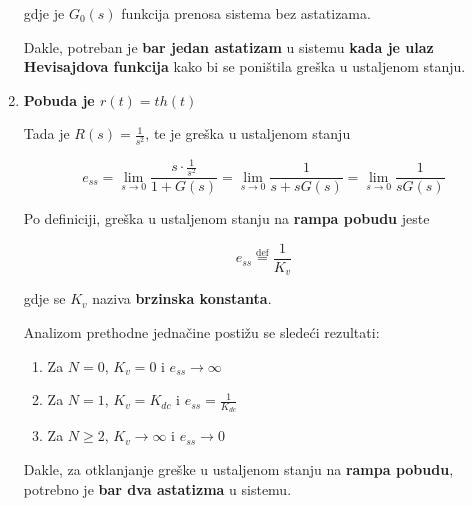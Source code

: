 \documentclass[12pt]{IEEEtran}
\numberwithin{equation}{subsection}
\numberwithin{figure}{section}
\begin{document}
\begin{enumerate}
          gdje je $G_{0}(s)$ funkcija prenosa sistema bez astatizama.

          Dakle, potreban je \textbf{bar jedan astatizam} u sistemu \textbf{kada je ulaz Hevisajdova funkcija} kako bi se poni\v{s}tila
          gre\v{s}ka u ustaljenom stanju.

          \vspace{12pt}

    \item \textbf{Pobuda je $r(t) = th(t)$}

          Tada je $R(s) = \frac{1}{s^{2}}$, te je gre\v{s}ka u ustaljenom stanju

          \begin{equation}
              e_{ss} = \lim_{s \to 0}{\frac{s \cdot \frac{1}{s^{2}}}{1 + G(s)}} = \lim_{s \to 0}{\frac{1}{s + sG(s)}} = \lim_{s \to 0}{\frac{1}{sG(s)}}
          \end{equation}

          Po definiciji, gre\v{s}ka u ustaljenom stanju na \textbf{rampa pobudu} jeste

          \begin{equation}
              e_{ss} \stackrel{\text{def}}{=} \frac{1}{K_{v}}
          \end{equation}

          gdje se $K_{v}$ naziva \textbf{brzinska konstanta}.

          \vspace{12pt}

          Analizom prethodne jedna\v{c}ine posti\v{z}u se slede\'{c}i rezultati:

          \begin{enumerate}
              \item Za $N = 0$, $K_{v} = 0$ i $e_{ss} \to \infty$
              \item Za $N = 1$, $K_{v} = K_{dc}$ i $e_{ss} = \frac{1}{K_{dc}}$
              \item Za $N \geq 2$, $K_{v} \to \infty$ i $e_{ss} \to 0$
          \end{enumerate}

          \vspace{12pt}

          Dakle, za otklanjanje gre\v{s}ke u ustaljenom stanju na \textbf{rampa pobudu},
          potrebno je \textbf{bar dva astatizma} u sistemu.

\end{enumerate}
\end{document}
